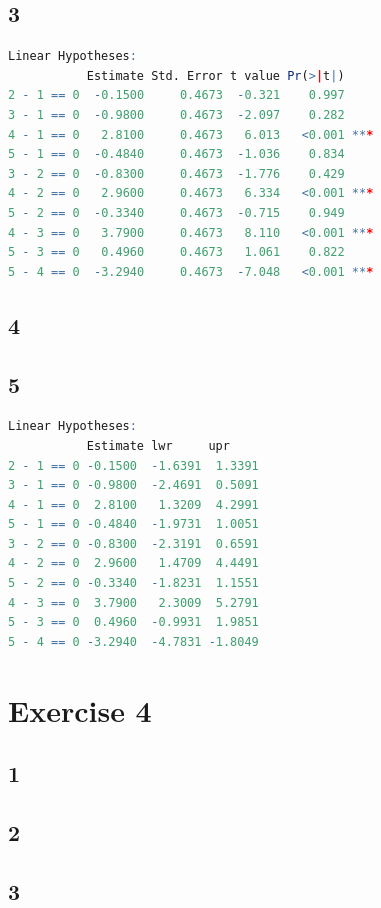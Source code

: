 \documentclass{article}
\begin{document}
    \subsection*{3}
      \begin{lstlisting}[language=R]
Linear Hypotheses:
           Estimate Std. Error t value Pr(>|t|)    
2 - 1 == 0  -0.1500     0.4673  -0.321    0.997    
3 - 1 == 0  -0.9800     0.4673  -2.097    0.282    
4 - 1 == 0   2.8100     0.4673   6.013   <0.001 ***
5 - 1 == 0  -0.4840     0.4673  -1.036    0.834    
3 - 2 == 0  -0.8300     0.4673  -1.776    0.429    
4 - 2 == 0   2.9600     0.4673   6.334   <0.001 ***
5 - 2 == 0  -0.3340     0.4673  -0.715    0.949    
4 - 3 == 0   3.7900     0.4673   8.110   <0.001 ***
5 - 3 == 0   0.4960     0.4673   1.061    0.822    
5 - 4 == 0  -3.2940     0.4673  -7.048   <0.001 ***
      \end{lstlisting}
    
    \subsection*{4}
    
    \subsection*{5}
      \begin{lstlisting}[language=R]
Linear Hypotheses:
           Estimate lwr     upr    
2 - 1 == 0 -0.1500  -1.6391  1.3391
3 - 1 == 0 -0.9800  -2.4691  0.5091
4 - 1 == 0  2.8100   1.3209  4.2991
5 - 1 == 0 -0.4840  -1.9731  1.0051
3 - 2 == 0 -0.8300  -2.3191  0.6591
4 - 2 == 0  2.9600   1.4709  4.4491
5 - 2 == 0 -0.3340  -1.8231  1.1551
4 - 3 == 0  3.7900   2.3009  5.2791
5 - 3 == 0  0.4960  -0.9931  1.9851
5 - 4 == 0 -3.2940  -4.7831 -1.8049
      \end{lstlisting}
    
  \section*{Exercise 4}
    \subsection*{1}
    
    \subsection*{2}
    
    \subsection*{3}
    
\end{document}
